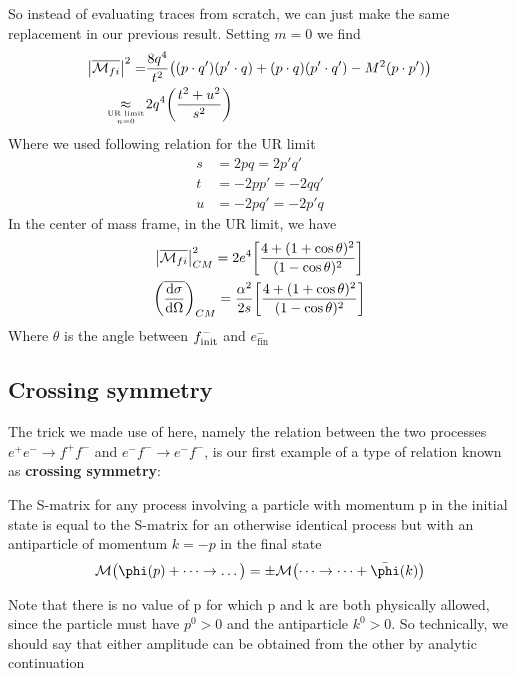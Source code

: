 \documentclass[TheoreticalPhy_ModB.tex]{subfiles}
\begin{document}
So instead of evaluating traces from scratch, we can just make the same replacement in our previous result. Setting $m = 0$ we find
\begin{align*}
\abs{\overline{\mathcal{M}_{fi}}}^2 = 	& \frac{8q^4}{t^2} \bigl( (p \cdot q')(p' \cdot q) + (p \cdot q)(p' \cdot q') - M^2 (p \cdot p') \bigr) \\
	\underset{\text{UR limit} \atop n=0}{\approx}
							& 2q^4 \biggl( \frac{t^2 + u^2}{s^2} \biggr)
\end{align*}
Where we used following relation for the UR limit
\[
\begin{split}
s 	& = 2pq = 2p'q' \\
t 	& = -2pp' = -2qq' \\
u 	& = -2pq' = -2p'q
\end{split}
\]
In the center of mass frame, in the UR limit, we have
\begin{gather*}
\abs{\overline{\mathcal{M}_{fi}}}^2_{CM} = 2e^4 \biggl[ \frac{4 + (1 + \cos \theta)^2}{(1 - \cos \theta)^2} \biggr] \\
\biggl( \overline{\frac{\textup{d} \sigma}{\textup{d} \Omega}} \biggr)_{CM} 
	= \frac{\alpha^2}{2s} \biggl[ \frac{4 + (1 + \cos \theta)^2}{(1 - \cos \theta)^2} \biggr]
\end{gather*}
Where $\theta$ is the angle between $f^-_{\textup{init}}$ and $e^-_{\text{fin}}$\\
 
\skipline
\subsection{Crossing symmetry}
The trick we made use of here, namely the relation between the two processes $e^+e^- \to f^+f^-$ and $e^-f^- \to e^-f^-$, is our first example of a type of relation known as \textbf{crossing symmetry}:
\begin{mdframed}[style=mybox]
The S-matrix for any process involving a particle with momentum p in the initial state is equal to the S-matrix for an otherwise identical process but with an antiparticle of momentum $k = -p$ in the final state
\[
\mathM \bigl( \phi(p) + \dots \to \dots \bigr) = \pm \mathM \bigl( \dots \to \dots + \bar{\phi}(k) \bigr)
\]
\end{mdframed}
Note that there is no value of p for which p and k are both physically allowed, since the particle must have $p^0 > 0$ and the antiparticle $k^0 > 0$.
So technically, we should say that either amplitude can be obtained from the other by analytic continuation\\
\end{document}
